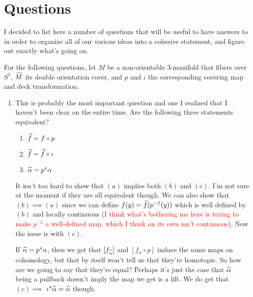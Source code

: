 \section{Questions}

I decided to list here a number of questions that will be useful to have answers to in order to organize all of our various ideas into a cohesive statement, and figure out exactly what's going on.

For the following questions, let $M$ be a non-orientable 3-manifold that fibers over $S^1$, $\widetilde{M}$ its double orientation cover, and $p$ and $\iota$ the corresponding covering map and deck transformation.

\begin{enumerate}
    \item This is probably the most important question and one I realized that I haven't been clear on the entire time. Are the following three statements equivalent?
    \begin{enumerate}
        \item $\widetilde{f} = f \circ p$
        \item $\widetilde{f} = \widetilde{f} \circ \iota$
        \item $\widetilde{\alpha} = p^*\alpha$
    \end{enumerate}
    It isn't too hard to show that $(a)$ implies both $(b)$ and $(c)$. I'm not sure at the moment if they are all equivalent though. We can also show that $(b) \implies (a)$ since we can define $f(y) = \widetilde{f}(p^{-1}(y))$ which is well defined by $(b)$ and locally continuous (\textcolor{red}{I think what's bothering me here is trying to make $p^{-1}$ a well-defined map, which I think on its own isn't continuous}). Now the issue is with $(c)$.
    
    If $\widetilde{\alpha} = p^*\alpha$, then we get that $[f_{\widetilde{\alpha}}]$ and $[f_\alpha \circ p]$ induce the same maps on cohomology, but that by itself won't tell us that they're homotopic. So how are we going to say that they're equal? Perhaps it's just the case that $\widetilde{\alpha}$ being a pullback doesn't imply the map we get is a lift. We do get that $(c) \implies$ $\iota^*\widetilde{\alpha} = \widetilde{\alpha}$ though.
     

\end{enumerate}
